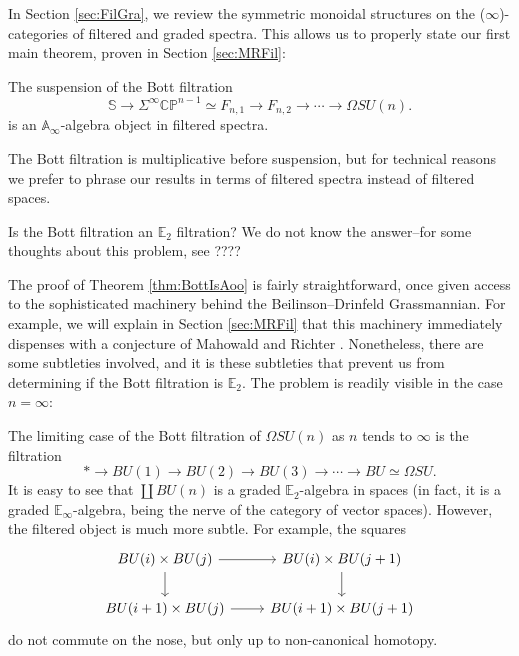 In Section \ref{sec:FilGra}, we review the symmetric monoidal structures on the ($\infty$)-categories of filtered and graded spectra.  This allows us to properly state our first main theorem, proven in Section \ref{sec:MRFil}:

\begin{thm} \label{thm:BottIsAoo}
The suspension of the Bott filtration 
$$\mathbb{S} \longrightarrow \Sigma^{\infty} \mathbb{CP}^{n-1} \simeq F_{n,1} \longrightarrow F_{n,2} \longrightarrow \cdots \longrightarrow \Omega SU(n).$$
is an $\mathbb{A}_\infty$-algebra object in filtered spectra.
\end{thm}

\begin{rmk}
The Bott filtration is multiplicative before suspension, but for technical reasons we prefer to phrase our results in terms of filtered spectra instead of filtered spaces.
\end{rmk}

\begin{qst}
Is the Bott filtration an $\mathbb{E}_2$ filtration?  We do not know the answer--for some thoughts about this problem, see ????
\end{qst}

The proof of Theorem \ref{thm:BottIsAoo} is fairly straightforward, once given access to the sophisticated machinery behind the Beilinson--Drinfeld Grassmannian.  For example, we will explain in Section \ref{sec:MRFil} that this machinery immediately dispenses with a conjecture of Mahowald and Richter \cite{MahowaldRichter}.  Nonetheless, there are some subtleties involved, and it is these subtleties that prevent us from determining if the Bott filtration is $\mathbb{E}_2$.  The problem is readily visible in the case $n=\infty$:

\begin{exm}
The limiting case of the Bott filtration of $\Omega SU(n)$ as $n$ tends to $\infty$ is the filtration
$$* \longrightarrow BU(1) \longrightarrow BU(2) \longrightarrow BU(3) \longrightarrow \cdots \longrightarrow BU \simeq \Omega SU.$$
It is easy to see that $\coprod BU(n)$ is a graded $\mathbb{E}_2$-algebra in spaces (in fact, it is a graded $\mathbb{E}_\infty$-algebra, being the nerve of the category of vector spaces).  However, the filtered object is much more subtle.  For example, the squares
$$
\begin{tikzcd}
BU(i) \times BU(j) \arrow{d} \arrow{r} & BU(i) \times BU(j+1) \arrow{d} \\
BU(i+1) \times BU(j) \arrow{r} & BU(i+1) \times BU(j+1)
\end{tikzcd}
$$
do not commute on the nose, but only up to non-canonical homotopy.
\end{exm}


